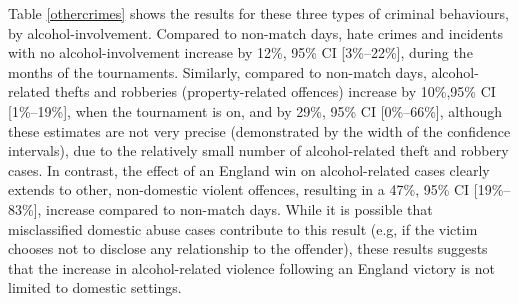 \documentclass[12pt, a4paper]{article}
\begin{document}
Table \ref{othercrimes} shows the results for these three types of criminal behaviours, by alcohol-involvement. Compared to non-match days, hate crimes and incidents with no alcohol-involvement increase by 12\%, 95\% CI [3\%--22\%], during the months of the tournaments. Similarly, compared to non-match days, alcohol-related thefts and robberies (property-related offences) increase by 10\%,95\% CI [1\%--19\%], when the tournament is on, and by 29\%, 95\% CI [0\%--66\%], although these estimates are not very precise (demonstrated by the width of the confidence intervals), due to the relatively small number of alcohol-related theft and robbery cases. In contrast, the effect of an England win on alcohol-related cases clearly extends to other, non-domestic violent offences, resulting in a 47\%, 95\% CI [19\%--83\%], increase compared to non-match days. While it is possible that misclassified domestic abuse cases contribute to this result (e.g, if the victim chooses not to disclose any relationship to the offender), these results suggests that the increase in alcohol-related violence following an England victory is not limited to domestic settings.
\end{document}

